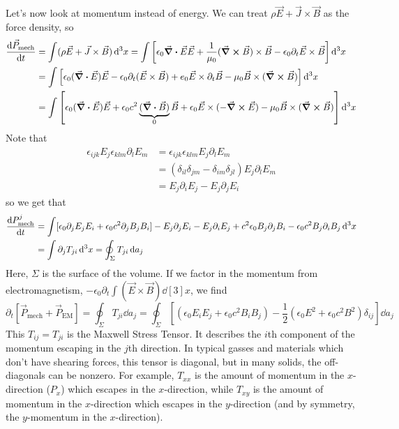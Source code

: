 \documentclass[a4paper,twoside,master.tex]{subfiles}
\begin{document}

Let's now look at momentum instead of energy. We can treat $ \rho \vec{E} + \vec{J} \times \vec{B} $ as the force density, so
\begin{align}
    \dv{ \vec{P}_{\text{mech}}}{t} &= \int (\rho \vec{E} + \vec{J} \times \vec{B}) \dd[3]{x} = \int \left[ \epsilon_0 \div{ \vec{E}} \vec{E} + \frac{1}{\mu_0} (\curl{ \vec{B}}) \times \vec{B} - \epsilon_0 \partial_t \vec{E} \times \vec{B} \right] \dd[3]{x}\\
    &= \int \left[ \epsilon_0 (\div{ \vec{E}}) \vec{E} - \epsilon_0 \partial_t ( \vec{E} \times \vec{B}) + e_0 \vec{E} \times \partial_t \vec{B} - \mu_0 \vec{B} \times (\curl{ \vec{B}}) \right] \dd[3]{x}\\
    &= \int \left[ \epsilon_0 (\div{ \vec{E}}) \vec{E} + \epsilon_0 c^2 \underbrace{(\div{ \vec{B}})}_{0} \vec{B} + \epsilon_0 \vec{E} \times (- \curl{ \vec{E}}) - \mu_0 \vec{B} \times (\curl{ \vec{B}}) \right] \dd[3]{x} 
\end{align}
Note that
\begin{align}
    \epsilon_{ijk} E_j \epsilon_{klm} \partial_l E_m &= \epsilon_{ijk} \epsilon_{klm} E_j \partial_l E_m\\
    &= (\delta_{il} \delta_{jm} - \delta_{im} \delta_{jl})E_j \partial_l E_m\\
    &= E_j \partial_i E_j - E_j \partial_j E_i
\end{align}
so we get that
\begin{align}
    \dv{ P^j_{\text{mech}}}{t} &= \int  [\epsilon_0\partial_j E_j E_i + \epsilon_0 c^2\partial_j B_j B_i] - E_j\partial_j E_i - E_j\partial_i E_j + c^2 \epsilon_0  B_j \partial_j B_i - \epsilon_0 c^2 B_j \partial_i B_j \dd[3]{x}\\
    &= \int \partial_j T_{ji} \dd[3]{x} = \oint_\Sigma T_{ji} \dd{a_j}
\end{align}
Here, $ \Sigma $ is the surface of the volume. If we factor in the momentum from electromagnetism, $ - \epsilon_0 \partial_t \int ( \vec{E} \times \vec{B}) \dd[3]{x} $, we find
\begin{equation}
    \partial_t\left[ \vec{P}_{\text{mech}} + \vec{P}_{\text{EM}} \right] = \oint_\Sigma T_{ji} \dd{a_j} = \oint_\Sigma \left[ (\epsilon_0 E_i E_j + \epsilon_0 c^2 B_i B_j) - \frac{1}{2} (\epsilon_0 E^2 + \epsilon_0 c^2 B^2)\delta_{ij} \right] \dd{a_j}
\end{equation}
This $ T_{ij} = T_{ji} $ is the Maxwell Stress Tensor. It describes the $ i $th component of the momentum escaping in the $ j $th direction. In typical gasses and materials which don't have shearing forces, this tensor is diagonal, but in many solids, the off-diagonals can be nonzero. For example, $ T_{xx} $ is the amount of momentum in the $ x $-direction ($ P_x $) which escapes in the $ x $-direction, while $ T_{xy} $ is the amount of momentum in the $ x $-direction which escapes in the $ y $-direction (and by symmetry, the $ y $-momentum in the $ x $-direction).
\end{document}
